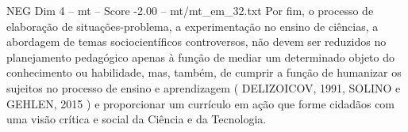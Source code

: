 \begin{textsample}{NEG Dim 4 – mt – Score -2.00 – mt/mt\_em\_32.txt}
Por fim, o processo de elaboração de situações-problema, a experimentação no ensino de ciências, a abordagem de temas sociocientíficos controversos, não devem ser reduzidos no planejamento pedagógico apenas à função de mediar um determinado objeto do conhecimento ou habilidade, mas, também, de cumprir a função de humanizar os sujeitos no processo de ensino e aprendizagem ( DELIZOICOV, 1991, SOLINO e GEHLEN, 2015 ) e proporcionar um currículo em ação que forme cidadãos com uma visão crítica e social da Ciência e da Tecnologia.

\end{textsample}

